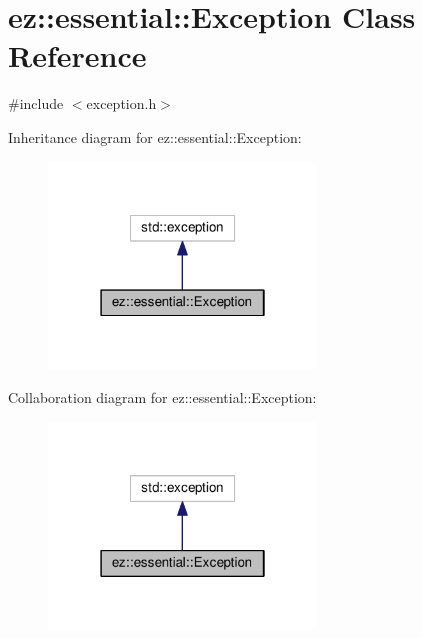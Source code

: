 \hypertarget{classez_1_1essential_1_1Exception}{}\section{ez\+:\+:essential\+:\+:Exception Class Reference}
\label{classez_1_1essential_1_1Exception}


{\ttfamily \#include $<$exception.\+h$>$}



Inheritance diagram for ez\+:\+:essential\+:\+:Exception\+:
\nopagebreak
\begin{figure}[H]
\begin{center}
\leavevmode
\includegraphics[width=202pt]{classez_1_1essential_1_1Exception__inherit__graph}
\end{center}
\end{figure}


Collaboration diagram for ez\+:\+:essential\+:\+:Exception\+:
\nopagebreak
\begin{figure}[H]
\begin{center}
\leavevmode
\includegraphics[width=202pt]{classez_1_1essential_1_1Exception__coll__graph}
\end{center}
\end{figure}

